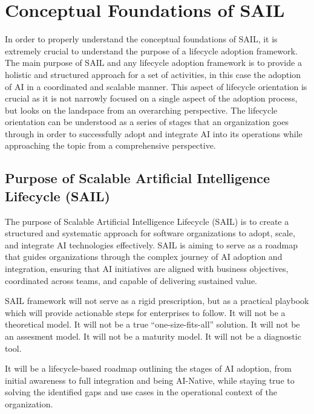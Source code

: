 \documentclass[]{imc-inf}
\begin{document}
\section{Conceptual Foundations of
	SAIL}\label{conceptual-foundations-of-sail}


In order to properly understand the conceptual foundations of SAIL, it
is extremely crucial to understand the purpose of a lifecycle adoption
framework. The main purpose of SAIL and any lifecycle adoption framework
is to provide a holistic and structured approach for a set of
activities, in this case the adoption of AI in a coordinated and
scalable manner. This aspect of lifecycle orientation is crucial as it
is not narrowly focused on a single aspect of the adoption process, but
looks on the landspace from an overarching perspective. The lifecycle
orientation can be understood as a series of stages that an organization
goes through in order to successfully adopt and integrate AI into its
operations while approaching the topic from a comprehensive perspective.




\subsection{Purpose of Scalable Artificial Intelligence
	Lifecycle
	(SAIL)}\label{purpose-of-Scalable-artificial-intelligence-lifecycle-sail}

The purpose of Scalable Artificial Intelligence Lifecycle (SAIL) is to
create a structured and systematic approach for software organizations
to adopt, scale, and integrate AI technologies effectively. SAIL is
aiming to serve as a roadmap that guides organizations through the
complex journey of AI adoption and integration, ensuring that AI
initiatives are aligned with business objectives, coordinated across
teams, and capable of delivering sustained value.

SAIL framework will not serve as a rigid prescription, but as a
practical playbook which will provide actionable steps for enterprises
to follow. It will not be a theoretical model. It will not be a true
``one-size-fits-all'' solution. It will not be an assesment model. It
will not be a maturity model. It will not be a diagnostic tool.

It will be a lifecycle-based roadmap outlining the stages of AI
adoption, from initial awareness to full integration and being
AI-Native, while staying true to solving the identified gaps and use
cases in the operational context of the organization.
\end{document}
